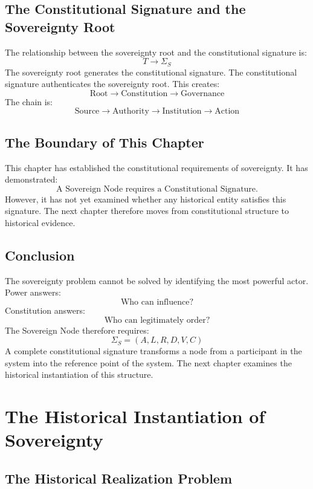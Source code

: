 \documentclass[11pt,openany]{book}
\theoremstyle{plain}
\theoremstyle{definition}
\begin{document}
\section{The Constitutional Signature and the Sovereignty Root}

The relationship between the sovereignty root and the constitutional signature is:
\[
T \longrightarrow \Sigma_S
\]
The sovereignty root generates the constitutional signature. The constitutional signature authenticates the sovereignty root. This creates:
\[
\text{Root} \longrightarrow \text{Constitution} \longrightarrow \text{Governance}
\]
The chain is:
\[
\boxed{
\text{Source} \longrightarrow \text{Authority} \longrightarrow \text{Institution} \longrightarrow \text{Action}
}
\]

\section{The Boundary of This Chapter}

This chapter has established the constitutional requirements of sovereignty. It has demonstrated:
\[
\boxed{
\text{A Sovereign Node requires a Constitutional Signature.}
}
\]
However, it has not yet examined whether any historical entity satisfies this signature. The next chapter therefore moves from constitutional structure to historical evidence.

\section{Conclusion}

The sovereignty problem cannot be solved by identifying the most powerful actor. Power answers:
\[
\text{Who can influence?}
\]
Constitution answers:
\[
\text{Who can legitimately order?}
\]
The Sovereign Node therefore requires:
\[
\Sigma_S = (A, L, R, D, V, C)
\]
A complete constitutional signature transforms a node from a participant in the system into the reference point of the system. The next chapter examines the historical instantiation of this structure.


\chapter{The Historical Instantiation of Sovereignty}

\section{The Historical Realization Problem}
\end{document}
